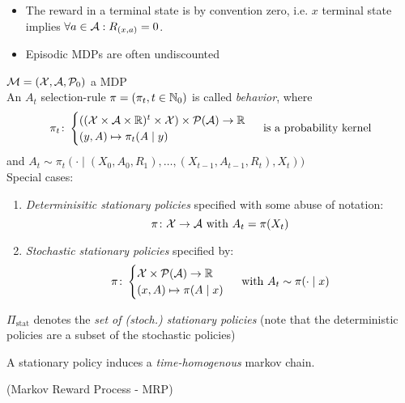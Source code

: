 \begin{remark}\leavevmode
	\begin{itemize}
		\item The reward in a terminal state is by convention zero, i.e. \(x\) terminal state implies \(\forall a\in\mathcal{A}: R_{(x,a)}=0\).
		\item Episodic MDPs are often undiscounted
	\end{itemize}	
\end{remark}
\begin{definition}\(\mathcal{M}=(\mathcal{X},\mathcal{A},\mathcal{P}_0)\) a MDP\\
	 An \(A_t\) selection-rule \(\pi=(\pi_t,t\in\mathbb{N}_0)\) is called \emph{behavior}, where
	 \[ 
	 	\pi_t\colon
	 	\begin{cases}
	 		((\mathcal{X}\times\mathcal{A}\times\mathbb{R})^t\times\mathcal{X})\times\mathcal{P}(\mathcal{A}) \to \mathbb{R} \\
	 		(y,A)\mapsto \pi_t(A\mid y)
	 	\end{cases} \text{ is a probability kernel}
	 \]
	 and \(A_t\sim \pi_t(\cdot\mid (X_0,A_0,R_1), \dots,(X_{t-1},A_{t-1},R_t),X_t))\)\\
	 Special cases:
	 \begin{enumerate}
	 	\item \emph{Determinisitic stationary policies} specified with some abuse of notation:
	 	\[\leavevmode \pi\colon\cX\to\cA \text{ with }A_t=\pi(X_t)\]
	 	\item \emph{Stochastic stationary policies} specified by:
	 	\[\pi\colon \begin{cases}
	 	\mathcal{X}\times\mathcal{P}(\mathcal{A})\to\mathbb{R}\\
	 	(x,A)\mapsto \pi(A\mid x)
	 	\end{cases} \text{ with } A_t\sim\pi(\cdot\mid x)
	 	\]
	 \end{enumerate}
	 \(\Pi_{\text{stat}}\) denotes the \emph{set of (stoch.) stationary policies} (note that the deterministic policies are a subset of the stochastic policies)
\end{definition}
\begin{remark}
A stationary policy induces a \emph{time-homogenous} markov chain.
\end{remark}
\begin{definition}(Markov Reward Process - MRP)
\end{definition}
